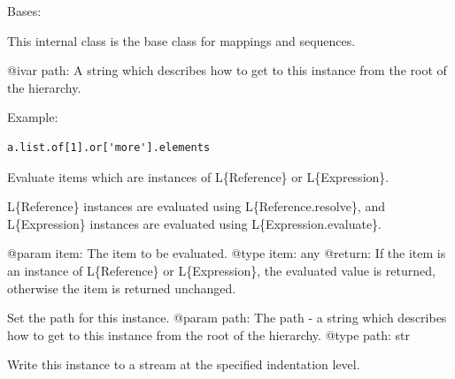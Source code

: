 \documentclass[a4paper,10pt,english]{sphinxmanual}
\begin{document}
\begin{fulllineitems}
\label{commands/apidoc/src:src.pyconf.Container}
Bases: 

This internal class is the base class for mappings and sequences.

@ivar path: A string which describes how to get
to this instance from the root of the hierarchy.

Example:

\begin{Verbatim}[commandchars=\\\{\}]
a.list.of[1].or['more'].elements
\end{Verbatim}

\begin{fulllineitems}
\label{commands/apidoc/src:src.pyconf.Container.evaluate}
Evaluate items which are instances of L\{Reference\} or L\{Expression\}.

L\{Reference\} instances are evaluated using L\{Reference.resolve\},
and L\{Expression\} instances are evaluated using
L\{Expression.evaluate\}.

@param item: The item to be evaluated.
@type item: any
@return: If the item is an instance of L\{Reference\} or L\{Expression\},
the evaluated value is returned, otherwise the item is returned
unchanged.

\end{fulllineitems}


\begin{fulllineitems}
\label{commands/apidoc/src:src.pyconf.Container.setPath}
Set the path for this instance.
@param path: The path - a string which describes how to get
to this instance from the root of the hierarchy.
@type path: str

\end{fulllineitems}


\begin{fulllineitems}
\label{commands/apidoc/src:src.pyconf.Container.writeToStream}
Write this instance to a stream at the specified indentation level.


\end{fulllineitems}
\end{fulllineitems}
\end{document}
